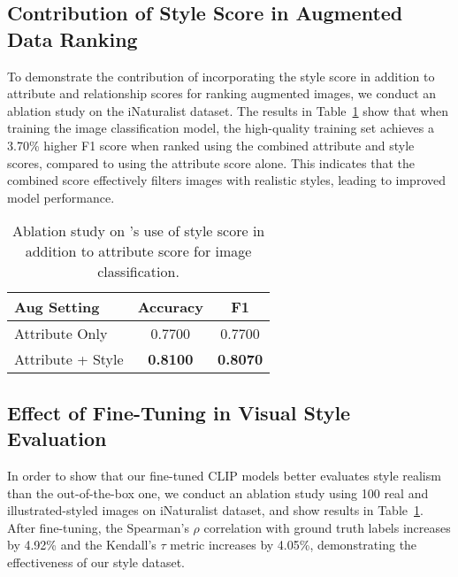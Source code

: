 \subsection{Contribution of Style Score in Augmented Data Ranking}
\label{ablation1}
To demonstrate the contribution of incorporating the style score in addition to attribute and relationship scores for ranking augmented images, we conduct an ablation study on the iNaturalist dataset. The results in Table~\ref{tab:ablation_style} show that when training the image classification model, the high-quality training set achieves a 3.70\% higher F1 score when ranked using the combined attribute and style scores, compared to using the attribute score alone. This indicates that the combined score effectively filters images with realistic styles, leading to improved model performance.

\begin{table}[ht!]
\centering
\begin{tabular}{@{}lcc@{}}
\toprule
Aug Setting & Accuracy & F1  \\ \midrule
Attribute Only & 0.7700 & 0.7700 \\
Attribute + Style & \textbf{0.8100} & \textbf{0.8070} \\ \bottomrule
\end{tabular}
\caption{Ablation study on \name's use of style score in addition to attribute score for image classification.}
\label{tab:ablation_style}
\end{table}

\subsection{Effect of Fine-Tuning in Visual Style Evaluation}
In order to show that our fine-tuned CLIP models better evaluates style realism than the out-of-the-box one, we conduct an ablation study using 100 real and illustrated-styled images on iNaturalist dataset, and show results in Table~\ref{tab:ablation_style}. After fine-tuning, the Spearman's $\rho$ correlation with ground truth labels increases by 4.92\% and the Kendall's $\tau$ metric increases by 4.05\%, demonstrating the effectiveness of our style dataset.

\begin{table}[ht!]
\centering
{}
\caption{Comparison of style evaluation results with and without fine-tuning the CLIP model, measured by alignment with human judgment on the iNaturalist dadtaset.}
\label{tab:ablation_ft}
\end{table}
